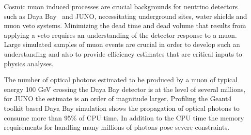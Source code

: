 \documentclass[a4paper]{jpconf}
\begin{document}

Cosmic muon induced processes are crucial backgrounds for neutrino
detectors such as Daya Bay~\cite{dyb} and JUNO\cite{juno}, 
necessitating underground sites, water shields and muon veto systems\cite{dybmuon}.
Minimizing the dead time and dead volume that results from applying 
a veto requires an understanding of the detector response to a muon.
Large simulated samples of muon events are crucial in order to 
develop such an understanding and also to provide efficiency estimates 
that are critical inputs to physics analyses.

The number of optical photons estimated to be produced by a muon of 
typical energy 100 GeV crossing the Daya Bay detector is at the level of several millions, 
for JUNO the estimate is an order of magnitude larger. 
Profiling the Geant4 toolkit based Daya Bay simulation 
shows the propagation of optical photons to consume more than 95\% of CPU time. 
In addition to the CPU time the memory requirements for handling many millions 
of photons pose severe constraints.  

%
%
\end{document}
